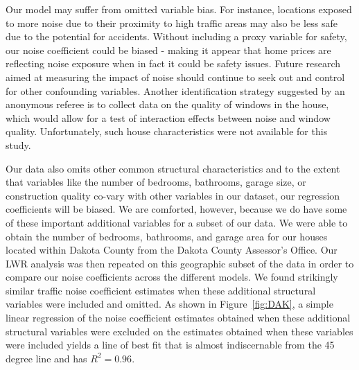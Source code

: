 \documentclass{article}\usepackage{graphicx, color}
\begin{document}
Our model may suffer from omitted variable bias. For instance, locations exposed to more noise due to their proximity to high traffic areas may also be less safe due to the potential for accidents. Without including a proxy variable for safety, our noise coefficient could be biased - making it appear that home prices are reflecting noise exposure when in fact it could be safety issues. Future research aimed at measuring the impact of noise should continue to seek out and control for other confounding variables. Another identification strategy suggested by an anonymous referee is to collect data on the quality of windows in the house, which would allow for a test of interaction effects between noise and window quality. Unfortunately, such house characteristics were not available for this study.

Our data also omits other common structural characteristics and to the extent that variables like the number of bedrooms, bathrooms, garage size, or construction quality co-vary with other variables in our dataset, our regression coefficients will be biased. We are comforted, however, because we do have some of these important additional variables for a subset of our data. We were able to obtain the number of bedrooms, bathrooms, and garage area for our houses located within Dakota County from the Dakota County Assessor's Office. Our LWR analysis was then repeated on this geographic subset of the data in order to compare our noise coefficients across the different models. We found strikingly similar traffic noise coefficient estimates when these additional structural variables were included and omitted. As shown in Figure~\ref{fig:DAK}, a simple linear regression of the noise coefficient estimates obtained when these additional structural variables were excluded on the estimates obtained when these variables were included yields a line of best fit that is almost indiscernable from the 45 degree line and has $R^2 = 0.96$. %
\end{document}
